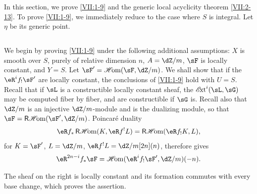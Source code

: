 In this section, we prove \ref{VII:1-9} and the generic local acyclicity theorem
\ref{VII:2-13}. To prove \ref{VII:1-9}, we immediately reduce to the case where
$S$ is integral. Let $\eta$ be its generic point.





\subsection{}\label{VII:2-1}

We begin by proving \ref{VII:1-9} under the following additional assumptions:
$X$ is smooth over $S$, purely of relative dimension $n$, $A=\dZ/m$, $\sF$ is
locally constant, and $Y=S$. Let $\sF'=\Hom(\sF,\dZ/m)$. We shall show that if
the $\eR^i f_! \sF'$ are locally constant, the conclusions of \ref{VII:1-9}
hold with $U=S$. Recall that if $\sL$ is a constructible locally constant
sheaf, the $\Ext^i(\sL,\sG)$ may be computed fiber by fiber, and are
constructible if $\sG$ is. Recall also that $\dZ/m$ is an injective
$\dZ/m$-module and is the dualizing module, so that
$\sF=\rHom(\sF',\dZ/m)$. Poincaré duality
\[
  \eR f_\ast \rHom(K,\eR f^! L) = \rHom(\eR f_! K,L) \text{,} 
\]
for $K=\sF'$, $L=\dZ/m$, $\eR f^! L = \dZ/m[2n](n)$, therefore gives
\[
  \eR^{2n-i} f_\ast \sF = \Hom(\eR^i f_! \sF',\dZ/m)(-n) \text{.} 
\]

The sheaf on the right is locally constant and its formation commutes with
every base change, which proves the assertion.





\subsection{}\label{VII:2-2}

